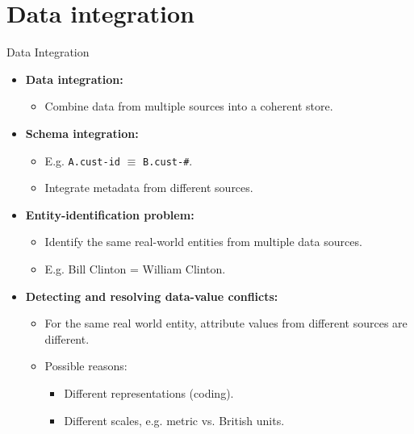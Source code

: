 \section{Data integration}

\begin{frame}{Data Integration}
	\begin{itemize}
		\item \textbf{Data integration:}
		\begin{itemize}
			\item Combine data from multiple sources into a coherent store.
		\end{itemize}
		\item \textbf{Schema integration:}
		\begin{itemize}
			\item E.g. \texttt{A.cust-id} $\equiv$ \texttt{B.cust-\#}.
			\item Integrate metadata from different sources.
		\end{itemize}
		\item \textbf{Entity-identification problem:}
		\begin{itemize}
			\item Identify the same real-world entities from multiple data 
			sources.
			\item E.g. Bill Clinton = William Clinton.
		\end{itemize}
		\item \textbf{Detecting and resolving {\color{airforceblue}data-value 
		conflicts}:}
		\begin{itemize}
			\item For the same real world entity, attribute values from 
			different sources are different.
			\item Possible reasons:
			\begin{itemize}
				\item Different representations (coding).
				\item Different scales, e.g. metric vs. British units.
			\end{itemize}
		\end{itemize}
	\end{itemize}
\end{frame}

